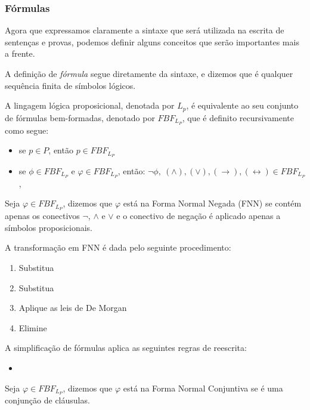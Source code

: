 \subsubsection{Fórmulas}
Agora que expressamos claramente a sintaxe que será utilizada na escrita de
sentenças e provas, podemos definir alguns conceitos que serão importantes mais
a frente.

A definição de \textit{fórmula} segue diretamente da sintaxe, e dizemos que é
qualquer sequência finita de símbolos lógicos. 

\begin{definition}
    A lingagem lógica proposicional, denotada por $L_p$, é equivalente ao seu
    conjunto de fórmulas bem-formadas, denotado por $FBF_{L_P}$, que é definito
    recursivamente como segue:
    \begin{itemize}
        \item se $p \in P$, então $p \in FBF_{L_P}$
            \item se $\phi \in FBF_{L_P}$ e $\varphi \in FBF_{L_P}$, então: $\neg
                \phi,\ (\wedge), (\vee), (\rightarrow), (\leftrightarrow) \in FBF_{L_P}$, 
            
    \end{itemize}
\end{definition}

\begin{definition} Seja $\varphi \in FBF_{L_P}$, dizemos que $\varphi$ está na Forma Normal Negada (FNN) se contém apenas os conectivos $\neg$, $\wedge$ e $\vee$ e o
    conectivo de negação é aplicado apenas a símbolos proposicionais.
\end{definition}

A transformação em FNN é dada pelo seguinte procedimento:
\begin{enumerate}
    \item Substitua
    \item Substitua
    \item Aplique as leis de De Morgan
    \item Elimine
\end{enumerate}

A simplificação de fórmulas aplica as seguintes regras de reescrita:
\begin{itemize}
    \item 
\end{itemize}

\begin{definition}
    Seja $\varphi \in FBF_{L_P}$, dizemos que $\varphi$ está na Forma Normal
    Conjuntiva se é uma conjunção de cláusulas.
\end{definition}

